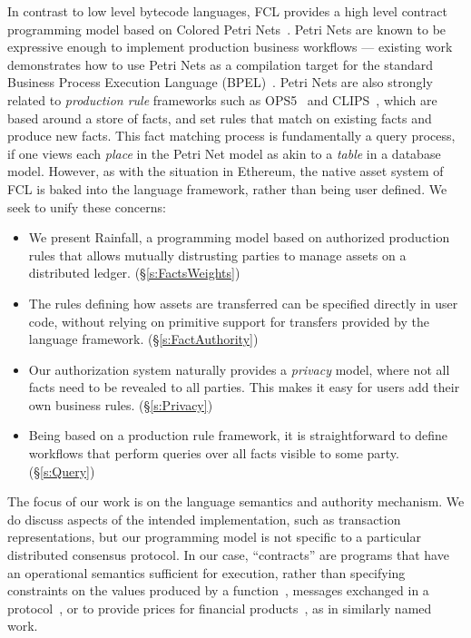 In contrast to low level bytecode languages, FCL provides a high level contract programming model based on Colored Petri Nets~\cite{Jensen1981:ColouredPetri}. Petri Nets are known to be expressive enough to implement production business workflows --- existing work demonstrates how to use Petri Nets as a compilation target for the standard Business Process Execution Language (BPEL)~\cite{Lohmann2009:PetriBPEL}. Petri Nets are also strongly related to \emph{production rule} frameworks such as OPS5~\cite{Forgy1981:OPS5} and CLIPS~\cite{Riley2017:CLIPS}, which are based around a store of facts, and set rules that match on existing facts and produce new facts. This fact matching process is fundamentally a query process, if one views each \emph{place} in the Petri Net model as akin to a \emph{table} in a database model. However, as with the situation in Ethereum, the native asset system of FCL is baked into the language framework, rather than being user defined. We seek to unify these concerns:

\begin{itemize}
\item We present Rainfall, a programming model based on authorized production rules that allows mutually distrusting parties to manage assets on a distributed ledger. (\S\ref{s:FactsWeights})

\item The rules defining how assets are transferred can be specified directly in user code, without relying on primitive support for transfers provided by the language framework. (\S\ref{s:FactAuthority})

\item Our authorization system naturally provides a \emph{privacy} model, where not all facts need to be revealed to all parties. This makes it easy for users add their own business rules. (\S\ref{s:Privacy})

\item Being based on a production rule framework, it is straightforward to define workflows that perform queries over all facts visible to some party. (\S\ref{s:Query})

\end{itemize}

The focus of our work is on the language semantics and authority mechanism. We do discuss aspects of the intended implementation, such as transaction representations, but our programming model is not specific to a particular distributed consensus protocol. In our case, ``contracts'' are programs that have an operational semantics sufficient for execution, rather than specifying constraints on the values produced by a function~\cite{Findler2002:Contracts}, messages exchanged in a protocol~\cite{Das2019:Resource, Deon2019:CSL}, or to provide prices for financial products~\cite{PeytonJones2000:Composing}, as in similarly named work.




